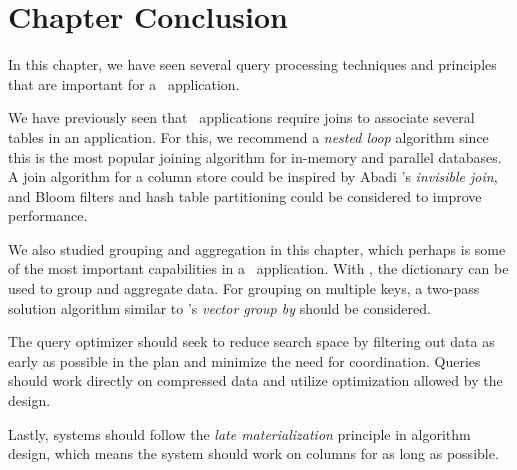 \section{Chapter Conclusion}
\label{sec:Chapter Conclusion}
In this chapter, we have seen several query processing techniques and principles that are important for a \bd~application.

We have previously seen that \bd~applications require joins to associate several tables in an application. For this, we recommend a \textit{nested loop} algorithm since this is the most popular joining algorithm for in-memory and parallel databases. A join algorithm for a column store could be inspired by Abadi \ea's \textit{invisible join}, and Bloom filters and hash table partitioning could be considered to improve performance.

We also studied grouping and aggregation in this chapter, which perhaps is some of the most important capabilities in a \bd~application. With \de, the dictionary can be used to group and aggregate data. For grouping on multiple keys, a two-pass solution algorithm similar to \oracle's \textit{vector group by} should be considered.

The query optimizer should seek to reduce search space by filtering out data as early as possible in the plan and minimize the need for coordination. Queries should work directly on compressed data and utilize optimization allowed by the design. 

Lastly, systems should follow the \textit{late materialization} principle in algorithm design, which means the system should work on columns for as long as possible. 
